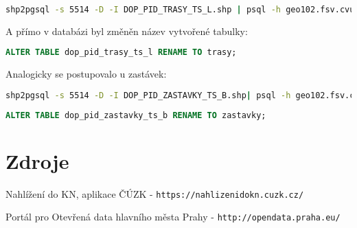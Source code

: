 \documentclass[a4paper, 12pt]{article}
\begin{document}
\begin{lstlisting}[language=bash]
shp2pgsql -s 5514 -D -I DOP_PID_TRASY_TS_L.shp | psql -h geo102.fsv.cvut.cz -d pgis_uzpd -U uzpd18_a
\end{lstlisting} 
 
A přímo v databázi byl změněn název vytvořené tabulky:

\begin{lstlisting}[language=sql]
ALTER TABLE dop_pid_trasy_ts_l RENAME TO trasy;
\end{lstlisting} 

Analogicky se postupovalo u zastávek:

\begin{lstlisting}[language=bash]
shp2pgsql -s 5514 -D -I DOP_PID_ZASTAVKY_TS_B.shp| psql -h geo102.fsv.cvut.cz -d pgis_uzpd -U uzpd18_a
\end{lstlisting} 

\begin{lstlisting}[language=sql]
ALTER TABLE dop_pid_zastavky_ts_b RENAME TO zastavky;
\end{lstlisting} 


 
\section{Zdroje}
\noindent
[1] Nahlížení do KN, aplikace ČÚZK - \texttt{https://nahlizenidokn.cuzk.cz/} 

\noindent
[2] Portál pro Otevřená data hlavního města Prahy - \texttt{http://opendata.praha.eu/}
\end{document}
